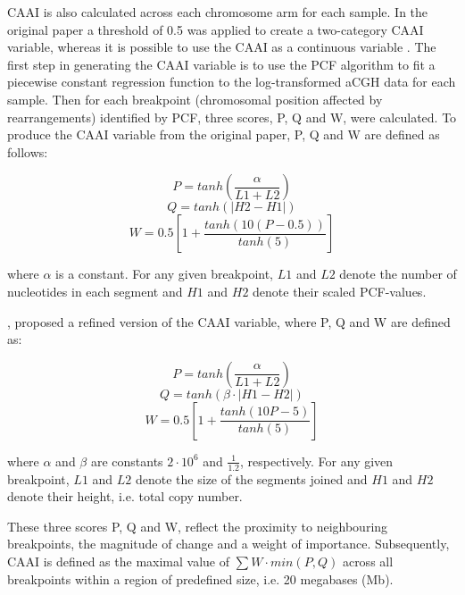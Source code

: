 CAAI is also calculated across each chromosome arm for each sample. In the original paper a threshold of 0.5 was applied to create a two-category CAAI variable, whereas it is possible to use the CAAI as a continuous variable \citep{pmid32242091}. The first step in generating the CAAI variable is to use the PCF algorithm to fit a piecewise constant regression function to the log-transformed aCGH data for each sample. Then for each breakpoint (chromosomal position affected by rearrangements) identified by PCF, three scores, P, Q and W, were calculated. To produce the CAAI variable from the original paper, P, Q and W are defined as follows: 

\begin{equation}
P = tanh \left( \frac{\alpha}{L1 + L2} \right)
\end{equation}
\begin{equation}
Q = tanh(|H2 - H1|)
\end{equation}
\begin{equation}
W = 0.5 \left[1 + \frac{tanh(10(P-0.5))}{tanh(5)} \right]
\end{equation}

where $\alpha$ is a constant. For any given breakpoint, $L1$ and $L2$ denote the number of nucleotides in each segment and $H1$ and $H2$ denote their scaled PCF-values.  

\cite{pmid32242091}, proposed a refined version of the CAAI variable, where P, Q and W are defined as: 

\begin{equation}
P = tanh \left(\frac{\alpha}{L1 + L2} \right)
\end{equation}
\begin{equation}
Q = tanh(\beta \cdot |H1 - H2|)
\end{equation}
\begin{equation}
W = 0.5 \left[1 + \frac{tanh(10P - 5)}{tanh(5)} \right]
\end{equation}

where $\alpha$ and $\beta$ are constants $2 \cdot 10^6$ and $\frac{1}{1.2}$, respectively. For any given breakpoint, $L1$ and $L2$ denote the size of the segments joined and $H1$ and $H2$ denote their height, i.e. total copy number. 

These three scores P, Q and W, reflect the proximity to neighbouring breakpoints, the magnitude of change and a weight of importance. Subsequently, CAAI is defined as the maximal value of $\sum W \cdot min(P, Q)$ across all breakpoints within a region of predefined size, i.e. 20 megabases (Mb).


